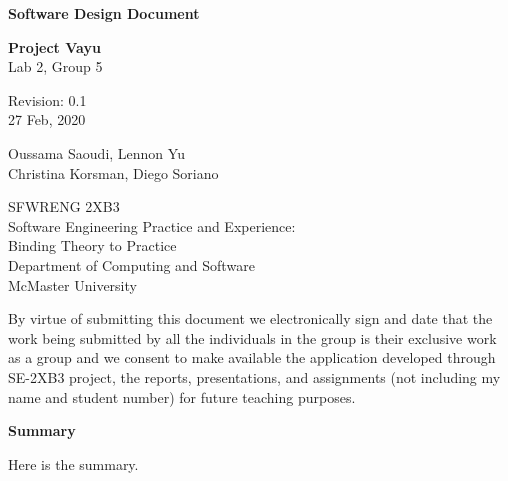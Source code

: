 \documentclass[12pt]{article}
\begin{document}
\begin{titlepage}
    \begin{center}
        \vspace*{1cm}
            
        \Huge
        \textbf{Software Design Document}

        \LARGE
        \vspace{0.5cm}
        \textbf{Project Vayu}\\
        \vspace{0.2cm}
        Lab 2, Group 5

        \vspace{0.5cm}
        Revision: 0.1\\
        \vspace{0.2cm}
        27 Feb, 2020
            
        \vspace{1.5cm}
            
        \Large
        Oussama Saoudi, Lennon Yu\\
        Christina Korsman, Diego Soriano

        \vfill
            
        \vspace{0.8cm}
                        
        \large
        SFWRENG 2XB3\\
        Software Engineering Practice and Experience:\\
        Binding Theory to Practice\\
        Department of Computing and Software\\
        McMaster University            
    \end{center}
\end{titlepage}

\newpage
By virtue of submitting this document we electronically sign and date
that the work being submitted by all the individuals in the group is
their exclusive work as a group and we consent to make available the
application developed through SE-2XB3 project, the reports,
presentations, and assignments (not including my name and student number)
for future teaching purposes. 

\newpage

\newpage
\begin{center}
\normalsize \textbf{Summary}
\end{center}
Here is the summary.
\end{document}
